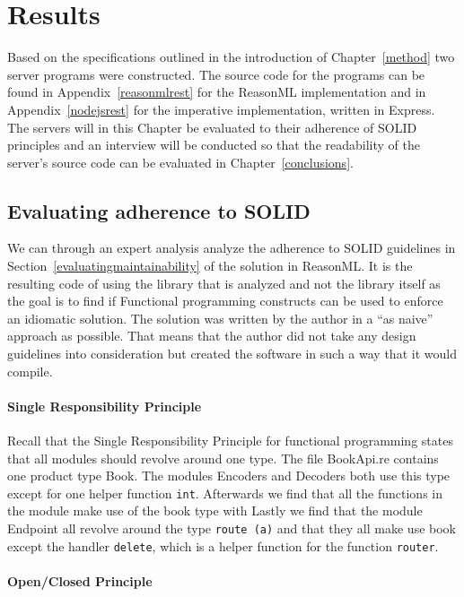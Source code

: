\chapter{Results}\label{results}

Based on the specifications outlined in the introduction of Chapter~\ref{method}
two server programs were constructed.  The source code for the programs can be
found in Appendix~\ref{reasonmlrest} for the ReasonML implementation and in
Appendix~\ref{nodejsrest} for the imperative implementation, written in Express.
The servers will in this Chapter be evaluated to their adherence of SOLID
principles and an interview will be conducted so that the readability of the
server's source code can be evaluated in Chapter~\ref{conclusions}.

\section{Evaluating adherence to SOLID}

We can through an expert analysis analyze the adherence to SOLID guidelines in
Section~\ref{evaluatingmaintainability} of the solution in ReasonML. It is the
resulting code of using the library that is analyzed and not the library itself
as the goal is to find if Functional programming constructs can be used to
enforce an idiomatic solution.  The solution was written by the author in a
``as naive'' approach as possible.  That means that the author did not take any
design guidelines into consideration but created the software in such a way
that it would compile.

\subsubsection{Single Responsibility Principle}

Recall that the Single Responsibility Principle for functional programming
states that all modules should revolve around one type.  The file BookApi.re
contains one product type Book. The modules Encoders and Decoders both use this
type except for one helper function \texttt{int}.  Afterwards we find that all
the functions in the module make use of the book type with Lastly we find that
the module Endpoint all revolve around the type \texttt{route (a)} and that they
all make use book except the handler \texttt{delete}, which is a helper
function for the function \texttt{router}.

\subsubsection{Open/Closed Principle}

